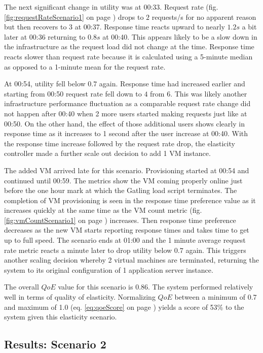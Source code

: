 \documentclass[english]{tktltiki2}
\theoremstyle{definition}
\theoremstyle{remark}
\begin{document}
The next significant change in utility was at 00:33. Request rate (fig.
\ref{fig:requestRateScenario1} on page \pageref{fig:requestRateScenario1}) drops
to $2$ requests/s for no apparent reason but then recovers to $3$ at 00:37.
Response time reacts upward to nearly $1.2 s$ a bit later at 00:36 returning to
$0.8 s$ at 00:40. This appears likely to be a slow down in the infrastructure as
the request load did not change at the time. Response time reacts slower than
request rate because it is calculated using a 5-minute median as opposed to a
1-minute mean for the request rate.

At 00:54, utility fell below $0.7$ again. Response time had increased earlier
and starting from 00:50 request rate fell down to $4$ from $6$. This was likely
another infrastructure performance fluctuation as a comparable request rate
change did not happen after 00:40 when 2 more users started making requests
just like at 00:50. On the other hand, the effect of those additional users shows
clearly in response time as it increases to 1 second after the user increase at
00:40. With the response time increase followed by the request rate drop, the
elasticity controller made a further scale out decision to add 1 VM instance.

The added VM arrived late for this scenario. Provisioning started at 00:54 and
continued until 00:59. The metrics show the VM coming properly online just
before the one hour mark at which the Gatling load script terminates. The
completion of VM provisioning is seen in the response time preference value as
it increases quickly at the same time as the VM count metric (fig.
\ref{fig:vmCountScenario1} on page \pageref{fig:vmCountScenario1}) increases.
Then response time preference decreases as the new VM starts reporting response
times and takes time to get up to full speed. The scenario ends at 01:00 and the
1 minute average request rate metric reacts a minute later to drop utility below
$0.7$ again. This triggers another scaling decision whereby 2 virtual machines
are terminated, returning the system to its original configuration of 1
application server instance.

The overall $QoE$ value for this scenario is $0.86$. The system performed
relatively well in terms of quality of elasticity. Normalizing $QoE$ between a
minimum of 0.7 and maximum of 1.0 (eq. \ref{eq:qoeScore} on page
\pageref{eq:qoeScore}) yields a score of 53\% to the system given this
elasticity scenario.

\subsection{Results: Scenario 2}
\end{document}
